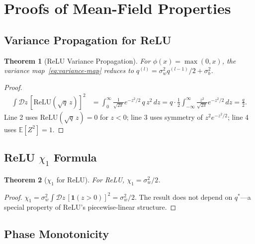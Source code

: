 \documentclass[10pt]{article}
\newcommand{\EE}{\mathbb{E}}
\newtheorem{theorem}{Theorem}
\begin{document}
\clearpage
\appendix

\section{Proofs of Mean-Field Properties}
\label{app:proofs}

\subsection{Variance Propagation for ReLU}

\begin{theorem}[ReLU Variance Propagation]
\label{thm:relu-variance}
For $\phi(x) = \max(0, x)$, the variance map~\eqref{eq:variance-map} reduces to $q^{(l)} = \sigma_w^2 q^{(l-1)}/2 + \sigma_b^2$.
\end{theorem}

\begin{proof}
\begin{align}
\int \mathcal{D}z\, [\text{ReLU}(\sqrt{q}\, z)]^2
&= \int_0^{\infty} \frac{1}{\sqrt{2\pi}} e^{-z^2/2}\, q\, z^2\, dz
= q \cdot \frac{1}{2} \int_{-\infty}^{\infty} \frac{z^2}{\sqrt{2\pi}} e^{-z^2/2}\, dz
= \frac{q}{2}.
\end{align}
Line 2 uses $\text{ReLU}(\sqrt{q}\,z) = 0$ for $z < 0$; line 3 uses symmetry of $z^2 e^{-z^2/2}$; line 4 uses $\EE[Z^2] = 1$.
\end{proof}

\subsection{ReLU $\chi_1$ Formula}

\begin{theorem}[$\chi_1$ for ReLU]
\label{thm:chi1-relu}
For ReLU, $\chi_1 = \sigma_w^2 / 2$.
\end{theorem}

\begin{proof}
$\chi_1 = \sigma_w^2 \int \mathcal{D}z\, [\mathbf{1}(z > 0)]^2 = \sigma_w^2/2$.
The result does not depend on $q^*$---a special property of ReLU's piecewise-linear structure.
\end{proof}

\subsection{Phase Monotonicity}
\end{document}
